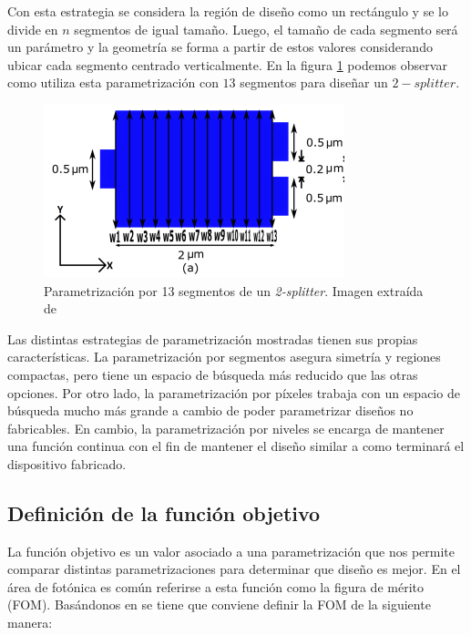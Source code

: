 Con esta estrategia se considera la región de diseño como un rectángulo y se lo divide en $n$ segmentos de igual tamaño. 
Luego, el tamaño de cada segmento será un parámetro y la geometría se forma a partir de estos valores considerando ubicar cada segmento centrado verticalmente. 
En la figura \ref{fig:splines} podemos observar como \cite{Prosopio-Galarza2019} utiliza esta parametrización con $13$ segmentos para diseñar un $2-splitter$.


\begin{figure}[h]
  \centering
  \includegraphics[scale=0.8]{image/theory/parametrization-spline.png}
  \caption{Parametrización por 13 segmentos de un \emph{2-splitter}. Imagen extraída de \cite{Prosopio-Galarza2019}}
  \label{fig:splines}
\end{figure}


Las distintas estrategias de parametrización mostradas tienen sus propias características.
La parametrización por segmentos asegura simetría y regiones compactas, pero tiene un espacio de búsqueda más reducido que las otras opciones.
Por otro lado, la parametrización por píxeles trabaja con un espacio de búsqueda mucho más grande a cambio de poder parametrizar diseños no fabricables.
En cambio, la parametrización por niveles se encarga de mantener una función continua con el fin de mantener el diseño similar a como terminará el dispositivo fabricado.

\subsection{Definición de la función objetivo}

La función objetivo es un valor asociado a una parametrización que nos permite comparar distintas parametrizaciones para determinar que diseño es mejor. 
En el área de fotónica es común referirse a esta función como la figura de mérito (FOM). 
Basándonos en \cite{Su2020} se tiene que conviene definir la FOM de la siguiente manera:

